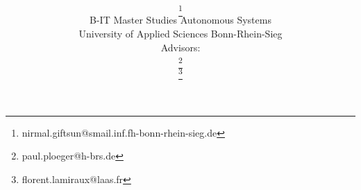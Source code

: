 \title{
{\PaperTitle}
\vspace{0.35cm}
\\
\PaperSubject
\vspace{0.40cm}
}
\author{\href{\PaperMainWriterEMail}
{\PaperMainWriter \footnote{\href{\PaperMainWriterEMail} {nirmal.giftsun@smail.inf.fh-bonn-rhein-sieg.de}}} 
\vspace{0.55cm} \\ 
B-IT Master Studies Autonomous Systems 
\vspace{0.25cm} \\ 
University of Applied Sciences Bonn-Rhein-Sieg 
\vspace{0.35cm} \\ 
\setcounter{footnote}{6}
Advisors:\vspace{0.15cm}\\ 
\href{\PaperLecturerEMail}{\PaperLecturerfirst \footnote{\href{\PaperLecturerEMail} {paul.ploeger@h-brs.de}}} \\  
\href{\PaperLecturerEMail}{\PaperLecturersecond\footnote{\href{\PaperLecturerEMail} {florent.lamiraux@laas.fr}}} \\  
}
\maketitle
